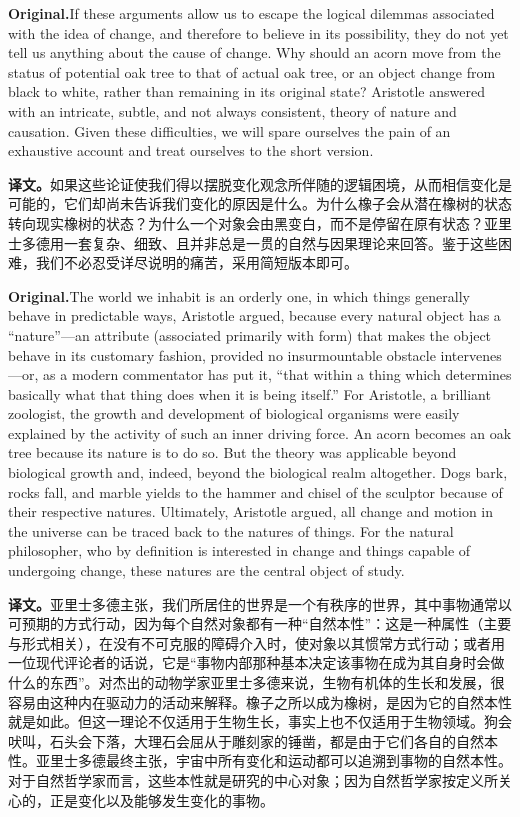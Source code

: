 \documentclass[UTF8]{ctexart}
\newcommand{\orig}{\par\noindent\textbf{Original.}\quad}
\newcommand{\zh}{\par\noindent\textbf{译文。}\quad}
\begin{document}
\orig If these arguments allow us to escape the logical dilemmas associated with the idea of change, and therefore to believe in its possibility, they do not yet tell us anything about the cause of change. Why should an acorn move from the status of potential oak tree to that of actual oak tree, or an object change from black to white, rather than remaining in its original state? Aristotle answered with an intricate, subtle, and not always consistent, theory of nature and causation. Given these difficulties, we will spare ourselves the pain of an exhaustive account and treat ourselves to the short version.

\zh 如果这些论证使我们得以摆脱变化观念所伴随的逻辑困境，从而相信变化是可能的，它们却尚未告诉我们变化的原因是什么。为什么橡子会从潜在橡树的状态转向现实橡树的状态？为什么一个对象会由黑变白，而不是停留在原有状态？亚里士多德用一套复杂、细致、且并非总是一贯的自然与因果理论来回答。鉴于这些困难，我们不必忍受详尽说明的痛苦，采用简短版本即可。

\orig The world we inhabit is an orderly one, in which things generally behave in predictable ways, Aristotle argued, because every natural object has a ``nature''---an attribute (associated primarily with form) that makes the object behave in its customary fashion, provided no insurmountable obstacle intervenes---or, as a modern commentator has put it, ``that within a thing which determines basically what that thing does when it is being itself.'' For Aristotle, a brilliant zoologist, the growth and development of biological organisms were easily explained by the activity of such an inner driving force. An acorn becomes an oak tree because its nature is to do so. But the theory was applicable beyond biological growth and, indeed, beyond the biological realm altogether. Dogs bark, rocks fall, and marble yields to the hammer and chisel of the sculptor because of their respective natures. Ultimately, Aristotle argued, all change and motion in the universe can be traced back to the natures of things. For the natural philosopher, who by definition is interested in change and things capable of undergoing change, these natures are the central object of study.

\zh 亚里士多德主张，我们所居住的世界是一个有秩序的世界，其中事物通常以可预期的方式行动，因为每个自然对象都有一种“自然本性”：这是一种属性（主要与形式相关），在没有不可克服的障碍介入时，使对象以其惯常方式行动；或者用一位现代评论者的话说，它是“事物内部那种基本决定该事物在成为其自身时会做什么的东西”。对杰出的动物学家亚里士多德来说，生物有机体的生长和发展，很容易由这种内在驱动力的活动来解释。橡子之所以成为橡树，是因为它的自然本性就是如此。但这一理论不仅适用于生物生长，事实上也不仅适用于生物领域。狗会吠叫，石头会下落，大理石会屈从于雕刻家的锤凿，都是由于它们各自的自然本性。亚里士多德最终主张，宇宙中所有变化和运动都可以追溯到事物的自然本性。对于自然哲学家而言，这些本性就是研究的中心对象；因为自然哲学家按定义所关心的，正是变化以及能够发生变化的事物。
\end{document}
